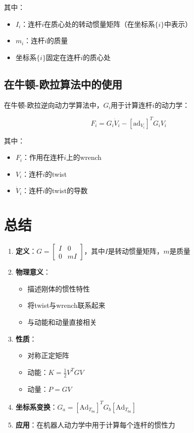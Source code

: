 \documentclass[12pt,a4paper]{article}
\begin{document}
其中：
\begin{itemize}
\item $I_i$：连杆$i$在质心处的转动惯量矩阵（在坐标系$\{i\}$中表示）
\item $m_i$：连杆$i$的质量
\item 坐标系$\{i\}$固定在连杆$i$的质心处
\end{itemize}

\subsection{在牛顿-欧拉算法中的使用}

在牛顿-欧拉逆向动力学算法中，$G_i$用于计算连杆$i$的动力学：

\begin{equation}
F_i = G_i \dot{V}_i - [\text{ad}_{V_i}]^T G_i V_i
\end{equation}

其中：
\begin{itemize}
\item $F_i$：作用在连杆$i$上的wrench
\item $V_i$：连杆$i$的twist
\item $\dot{V}_i$：连杆$i$的twist的导数
\end{itemize}

\section{总结}

\begin{enumerate}
\item \textbf{定义}：$G = \begin{bmatrix} I & 0 \\ 0 & mI \end{bmatrix}$，其中$I$是转动惯量矩阵，$m$是质量

\item \textbf{物理意义}：
\begin{itemize}
\item 描述刚体的惯性特性
\item 将twist与wrench联系起来
\item 与动能和动量直接相关
\end{itemize}

\item \textbf{性质}：
\begin{itemize}
\item 对称正定矩阵
\item 动能：$K = \frac{1}{2} V^T G V$
\item 动量：$P = G V$
\end{itemize}

\item \textbf{坐标系变换}：$G_a = [\text{Ad}_{T_{ba}}]^T G_b [\text{Ad}_{T_{ba}}]$

\item \textbf{应用}：在机器人动力学中用于计算每个连杆的惯性力
\end{enumerate}
\end{document}

